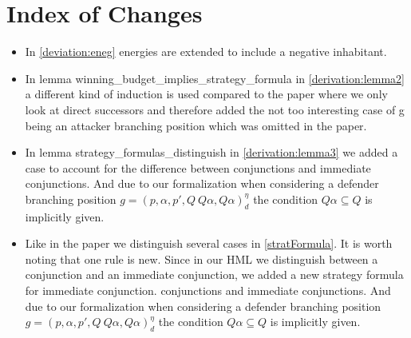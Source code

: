 \section{Index of Changes}
\begin{itemize}
    \item In \ref{deviation:eneg} energies are extended to include a negative inhabitant. 
    \item  In lemma winning\_budget\_implies\_strategy\_formula in \ref{derivation:lemma2} a different kind of induction is used compared to the paper 
    where we only look at direct successors and therefore added the not too interesting case of g being an 
    attacker branching position which was omitted in the paper.
   \item In lemma strategy\_formulas\_distinguish in  \ref{derivation:lemma3} we added a case to account for the difference between 
conjunctions and immediate conjunctions. And due to our formalization when considering a
defender branching position $g=(p,\alpha ,p', Q \ Q\alpha, Q\alpha)_d^\eta$ the condition 
$Q \alpha \subseteq Q$ is implicitly given.
  \item Like in the paper we distinguish several cases in \ref{stratFormula}. It is worth noting that one rule is new.
Since in our HML we distinguish between a conjunction and an immediate conjunction, we added a new strategy formula for immediate conjunction.
    conjunctions and immediate conjunctions. And due to our formalization when considering a
    defender branching position $g=(p,\alpha ,p', Q \ Q\alpha, Q\alpha)_d^\eta$ the condition 
    $Q \alpha \subseteq Q$ is implicitly given.
\end{itemize}
